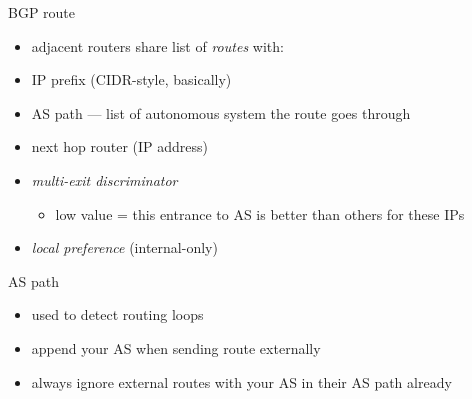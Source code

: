 \begin{frame}{BGP route}
    \begin{itemize}
    \item adjacent routers share list of \textit{routes} with:
    \vspace{.5cm}
    \item IP prefix (CIDR-style, basically)
    \item AS path --- list of autonomous system the route goes through
    \item next hop router (IP address)
    \item \textit{multi-exit discriminator}
        \begin{itemize}
        \item low value = this entrance to AS is better than others for these IPs
        \end{itemize}
    \item \textit{local preference} (internal-only)
    \end{itemize}
\end{frame}

\begin{frame}{AS path}
    \begin{itemize}
    \item used to detect routing loops
    \vspace{.5cm}
    \item append your AS when sending route externally
    \item always ignore external routes with your AS in their AS path already
    \end{itemize}
\end{frame}
